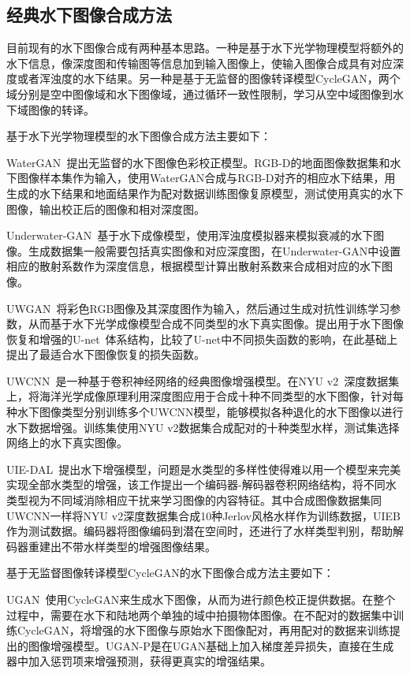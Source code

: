 \subsection{经典水下图像合成方法}
目前现有的水下图像合成有两种基本思路。一种是基于水下光学物理模型将额外的水下信息，像深度图和传输图等信息加到输入图像上，使输入图像合成具有对应深度或者浑浊度的水下结果。另一种是基于无监督的图像转译模型CycleGAN，两个域分别是空中图像域和水下图像域，通过循环一致性限制，学习从空中域图像到水下域图像的转译。

基于水下光学物理模型的水下图像合成方法主要如下：

WaterGAN~\cite{li2017watergan}提出无监督的水下图像色彩校正模型。RGB-D的地面图像数据集和水下图像样本集作为输入，使用WaterGAN合成与RGB-D对齐的相应水下结果，用生成的水下结果和地面结果作为配对数据训练图像复原模型，测试使用真实的水下图像，输出校正后的图像和相对深度图。

Underwater-GAN~\cite{yu2018underwater}基于水下成像模型，使用浑浊度模拟器来模拟衰减的水下图像。生成数据集一般需要包括真实图像和对应深度图，在Underwater-GAN中设置相应的散射系数作为深度信息，根据模型计算出散射系数来合成相对应的水下图像。

UWGAN~\cite{wang2019uwgan}将彩色RGB图像及其深度图作为输入，然后通过生成对抗性训练学习参数，从而基于水下光学成像模型合成不同类型的水下真实图像。提出用于水下图像恢复和增强的U-net~\cite{ronneberger2015u}体系结构，比较了U-net中不同损失函数的影响，在此基础上提出了最适合水下图像恢复的损失函数。

UWCNN~\cite{li2020underwater}是一种基于卷积神经网络的经典图像增强模型。在NYU v2~\cite{Silberman:ECCV12}深度数据集上，将海洋光学成像原理利用深度图应用于合成十种不同类型的水下图像，针对每种水下图像类型分别训练多个UWCNN模型，能够模拟各种退化的水下图像以进行水下数据增强。训练集使用NYU v2数据集合成配对的十种类型水样，测试集选择网络上的水下真实图像。

UIE-DAL~\cite{uplavikar2019all}提出水下增强模型，问题是水类型的多样性使得难以用一个模型来完美实现全部水类型的增强，该工作提出一个编码器-解码器卷积网络结构，将不同水类型视为不同域消除相应干扰来学习图像的内容特征。其中合成图像数据集同UWCNN一样将NYU v2深度数据集合成10种Jerlov风格水样作为训练数据，UIEB作为测试数据。编码器将图像编码到潜在空间时，还进行了水样类型判别，帮助解码器重建出不带水样类型的增强图像结果。


基于无监督图像转译模型CycleGAN的水下图像合成方法主要如下：

UGAN~\cite{fabbri2018enhancing}使用CycleGAN来生成水下图像，从而为进行颜色校正提供数据。在整个过程中，需要在水下和陆地两个单独的域中拍摄物体图像。在不配对的数据集中训练CycleGAN，将增强的水下图像与原始水下图像配对，再用配对的数据来训练提出的图像增强模型。UGAN-P是在UGAN基础上加入梯度差异损失，直接在生成器中加入惩罚项来增强预测，获得更真实的增强结果。

